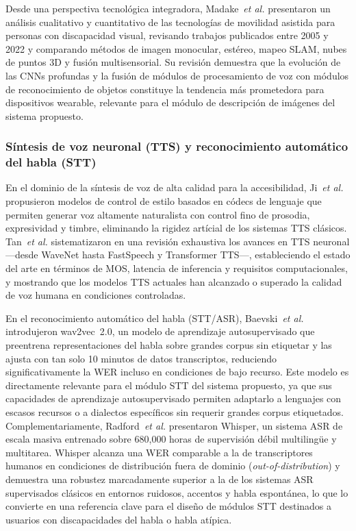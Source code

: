 \documentclass[journal]{IEEEtran}
\begin{document}
				Desde una perspectiva tecnol\'ogica integradora, Madake~\textit{et al.} \cite{madake2023} presentaron un an\'alisis cualitativo y cuantitativo de las tecnolog\'ias de movilidad asistida para personas con discapacidad visual, revisando trabajos publicados entre 2005 y 2022 y comparando m\'etodos de imagen monocular, est\'ereo, mapeo SLAM, nubes de puntos 3D y fusi\'on multisensorial. Su revisi\'on demuestra que la evoluci\'on de las CNNs profundas y la fusi\'on de m\'odulos de procesamiento de voz con m\'odulos de reconocimiento de objetos constituye la tendencia m\'as prometedora para dispositivos wearable, relevante para el m\'odulo de descripci\'on de im\'agenes del sistema propuesto.
				
			\subsubsection{S\'intesis de voz neuronal (TTS) y reconocimiento autom\'atico del habla (STT)}
				En el dominio de la s\'intesis de voz de alta calidad para la accesibilidad, Ji~\textit{et al.} \cite{ji2024} propusieron modelos de control de estilo basados en c\'odecs de lenguaje que permiten generar voz altamente naturalista con control fino de prosodia, expresividad y timbre, eliminando la rigidez art\'icial de los sistemas TTS cl\'asicos. Tan~\textit{et al.} \cite{tan2021} sistematizaron en una revisi\'on exhaustiva los avances en TTS neuronal ---desde WaveNet hasta FastSpeech y Transformer TTS---, estableciendo el estado del arte en t\'erminos de MOS, latencia de inferencia y requisitos computacionales, y mostrando que los modelos TTS actuales han alcanzado o superado la calidad de voz humana en condiciones controladas.
				
				En el reconocimiento autom\'atico del habla (STT/ASR), Baevski~\textit{et al.} \cite{baevski2020} introdujeron wav2vec~2.0, un modelo de aprendizaje autosupervisado que preentrena representaciones del habla sobre grandes corpus sin etiquetar y las ajusta con tan solo 10 minutos de datos transcriptos, reduciendo significativamente la WER incluso en condiciones de bajo recurso. Este modelo es directamente relevante para el m\'odulo STT del sistema propuesto, ya que sus capacidades de aprendizaje autosupervisado permiten adaptarlo a lenguajes con escasos recursos o a dialectos espec\'ificos sin requerir grandes corpus etiquetados. Complementariamente, Radford~\textit{et al.} \cite{radford2023} presentaron Whisper, un sistema ASR de escala masiva entrenado sobre 680{,}000 horas de supervisi\'on d\'ebil multiling\"ue y multitarea. Whisper alcanza una WER comparable a la de transcriptores humanos en condiciones de distribuci\'on fuera de dominio (\textit{out-of-distribution}) y demuestra una robustez marcadamente superior a la de los sistemas ASR supervisados cl\'asicos en entornos ruidosos, accentos y habla espont\'anea, lo que lo convierte en una referencia clave para el dise\~no de m\'odulos STT destinados a usuarios con discapacidades del habla o habla at\'ipica.
				
\end{document}
